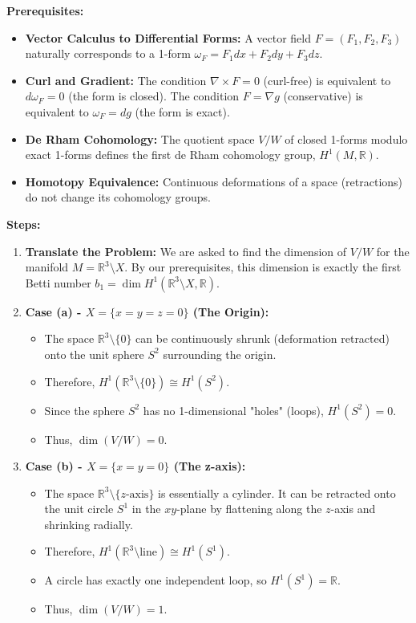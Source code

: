 \begin{solution}
\textbf{Prerequisites:}
\begin{itemize}
    \item \textbf{Vector Calculus to Differential Forms:} A vector field $F = (F_1, F_2, F_3)$ naturally corresponds to a 1-form $\omega_F = F_1 dx + F_2 dy + F_3 dz$. 
    \item \textbf{Curl and Gradient:} The condition $\nabla \times F = 0$ (curl-free) is equivalent to $d\omega_F = 0$ (the form is closed). The condition $F = \nabla g$ (conservative) is equivalent to $\omega_F = dg$ (the form is exact).
    \item \textbf{De Rham Cohomology:} The quotient space $V/W$ of closed 1-forms modulo exact 1-forms defines the first de Rham cohomology group, $H^1(M, \mathbb{R})$.
    \item \textbf{Homotopy Equivalence:} Continuous deformations of a space (retractions) do not change its cohomology groups.
\end{itemize}

\medskip
\textbf{Steps:}
\begin{enumerate}
    \item \textbf{Translate the Problem:} We are asked to find the dimension of $V/W$ for the manifold $M = \mathbb{R}^3 \setminus X$. By our prerequisites, this dimension is exactly the first Betti number $b_1 = \dim H^1(\mathbb{R}^3 \setminus X, \mathbb{R})$.

    \item \textbf{Case (a) - $X = \{x=y=z=0\}$ (The Origin):}
    \begin{itemize}
        \item The space $\mathbb{R}^3 \setminus \{0\}$ can be continuously shrunk (deformation retracted) onto the unit sphere $S^2$ surrounding the origin.
        \item Therefore, $H^1(\mathbb{R}^3 \setminus \{0\}) \cong H^1(S^2)$.
        \item Since the sphere $S^2$ has no 1-dimensional "holes" (loops), $H^1(S^2) = 0$.
        \item Thus, $\dim(V/W) = 0$.
    \end{itemize}

    \medskip
    \item \textbf{Case (b) - $X = \{x=y=0\}$ (The z-axis):}
    \begin{itemize}
        \item The space $\mathbb{R}^3 \setminus \{z\text{-axis}\}$ is essentially a cylinder. It can be retracted onto the unit circle $S^1$ in the $xy$-plane by flattening along the $z$-axis and shrinking radially.
        \item Therefore, $H^1(\mathbb{R}^3 \setminus \text{line}) \cong H^1(S^1)$.
        \item A circle has exactly one independent loop, so $H^1(S^1) = \mathbb{R}$.
        \item Thus, $\dim(V/W) = 1$.
    \end{itemize}


\end{enumerate}
\end{solution}
